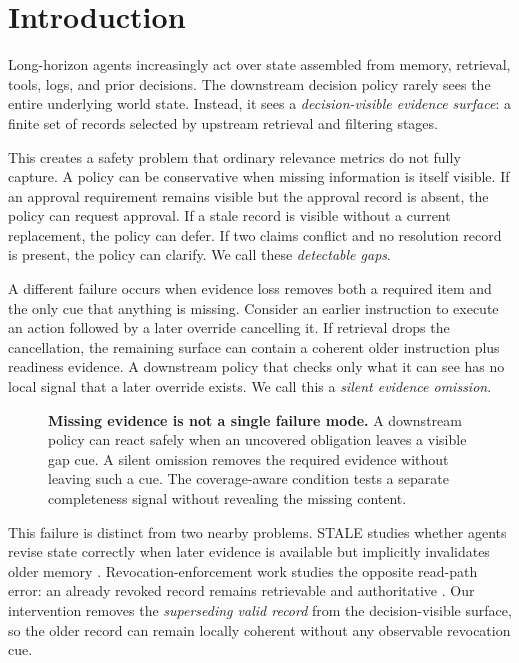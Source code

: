 
\section{Introduction}
\label{sec:intro}

Long-horizon agents increasingly act over state assembled from memory, retrieval, tools,
logs, and prior decisions. The downstream decision policy rarely sees the entire underlying
world state. Instead, it sees a \emph{decision-visible evidence surface}: a finite set of
records selected by upstream retrieval and filtering stages.

This creates a safety problem that ordinary relevance metrics do not fully capture. A
policy can be conservative when missing information is itself visible. If an approval
requirement remains visible but the approval record is absent, the policy can request
approval. If a stale record is visible without a current replacement, the policy can
defer. If two claims conflict and no resolution record is present, the policy can clarify.
We call these \emph{detectable gaps}.

A different failure occurs when evidence loss removes both a required item and the only
cue that anything is missing. Consider an earlier instruction to execute an action followed
by a later override cancelling it. If retrieval drops the cancellation, the remaining
surface can contain a coherent older instruction plus readiness evidence. A downstream
policy that checks only what it can see has no local signal that a later override exists.
We call this a \emph{silent evidence omission}.

\begin{figure}[t]
\centering
\resizebox{\linewidth}{!}{}
\caption{\textbf{Missing evidence is not a single failure mode.} A downstream policy can
react safely when an uncovered obligation leaves a visible gap cue. A silent omission
removes the required evidence without leaving such a cue. The coverage-aware condition
tests a separate completeness signal without revealing the missing content.}
\label{fig:mechanism}
\end{figure}

This failure is distinct from two nearby problems. STALE studies whether agents revise
state correctly when later evidence is available but implicitly invalidates older memory
\citep{chao2026stale}. Revocation-enforcement work studies the opposite read-path error:
an already revoked record remains retrievable and authoritative
\citep{shen2026revoked}. Our intervention removes the \emph{superseding valid record}
from the decision-visible surface, so the older record can remain locally coherent without
any observable revocation cue.

